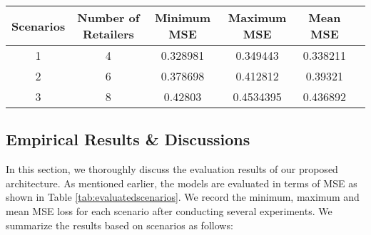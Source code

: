 \documentclass[10pt, conference]{IEEEtran}
\begin{document}
\begin{table*}[!h]
    \centering
    \caption{Evaluated Scenarios}
    \begin{tabular}{|c|c|c|c|c|c|}
    \hline
    \textbf{Scenarios} & \textbf{Number of Retailers} &\textbf{Minimum MSE} & \textbf{Maximum MSE} & \textbf{Mean MSE}\\\hline
    1 & 4 &0.328981 &0.349443 &0.338211 \\\hline
    2 & 6 &0.378698 &0.412812 &0.39321 \\\hline
    3 & 8 &0.42803 &0.4534395 &0.436892 \\\hline
    \end{tabular}
    \label{tab:evaluatedscenarios}
\end{table*}

\begin{figure*}[!h]
    \centering
    \qquad
    \qquad
    \caption{Predictions for the next five half-hours for a retailer who did not participate in the training.}%
    \label{fig:prediction}
\end{figure*}


\subsection{Empirical Results \& Discussions}

In this section, we thoroughly discuss the evaluation results of our proposed architecture. As  mentioned earlier, the models are evaluated in terms of MSE as shown in Table \ref{tab:evaluatedscenarios}. We record the minimum, maximum and mean MSE loss for each scenario after conducting several experiments. We summarize the results based on scenarios as follows:
\end{document}
